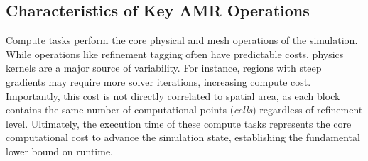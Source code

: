 

\subsection{Characteristics of Key AMR Operations}
\label{sec:amr:bg:ops}


Compute tasks perform the core physical and mesh operations of the simulation.
While operations like refinement tagging often have predictable costs, physics kernels are a major
source of variability.
For instance, regions with steep gradients may require more solver iterations, increasing compute
cost.
Importantly, this cost is not directly correlated to spatial area, as each block contains the same
number of computational points (\emph{cells}) regardless of refinement level.
Ultimately, the execution time of these compute tasks represents the core computational cost to
advance the simulation state, establishing the fundamental lower bound on runtime.

